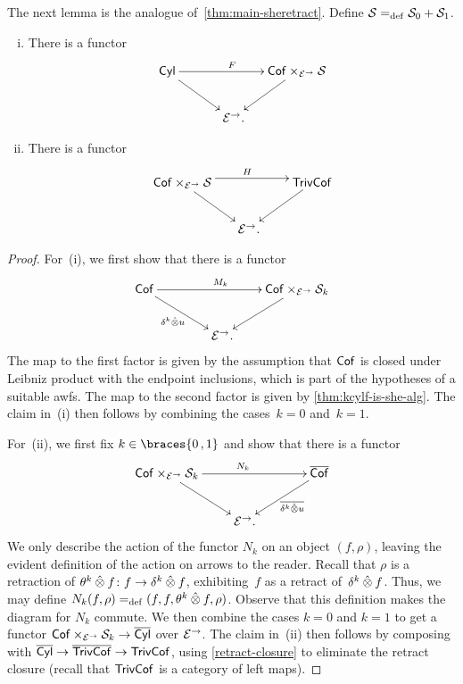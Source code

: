 \documentclass[reqno,10pt,a4paper,oneside,draft]{amsart}
\begin{document}
{{The next lemma is the analogue of~\cref{thm:main-sheretract}.
Define $\cal{S} \defeq  \cal{S}_0 + \cal{S}_1$.

\begin{proposition} \label{thm:strong-hequiv} \leavevmode
\begin{enumerate}[(i)]
\item \label{thm:onedir} There is a functor
\[
\xymatrix@!C@C-2.5em{
  \Cyl
  \ar[dr]
  \ar[rr]^F
&&
  \Cof \times_{\cal{E}^\to} \cal{S}
  \ar[dl]
\\&
  \catE^\to
\rlap{.}}
\]
\item \label{thm:twodir} There is a functor
\[
\xymatrix@!C@C-2.5em{
  \Cof \times_{\cal{E}^\to} \cal{S}
  \ar[dr]
  \ar@<4pt>[rr]^{H}
&&
  \TrivCof
  \ar[dl]
\\&
  \catE^\to
\rlap{.}}
\]
\end{enumerate}
\end{proposition}

\begin{proof}
For~(i), we first show that there is a functor
\[
\xymatrix@!C@C-2em{
  \Cof
  \ar[dr]_{\kcyl \hatotimes u} \ar[rr]^{M_k}
&&
  \Cof \times_{\cal{E}^\to} \cal{S}_k
  \ar[dl]
\\&
   \catE^\to
\rlap{.}}
\]
The map to the first factor is given by the assumption that $\Cof$ is closed under Leibniz product with the endpoint inclusions, which is part of the hypotheses of a suitable awfs.
The map to the second factor is given by \cref{thm:kcylf-is-she-alg}.
The claim in~(i) then follows by combining the cases~$k = 0$ and~$k = 1$.

For~(ii), we first fix $k \in \braces{0\,, 1}$ and show that there is a functor
\begin{equation} \label{lem:from-strong-hequiv}
\begin{gathered}
\xymatrix@!C@C-2em{
  \Cof \times_{\cal{E}^\to} \cal{S}_k
  \ar[dr]
  \ar[rr]^{N_k}
&&
  \overline{\Cof}
  \ar[dl]^-{\overline{\kcyl \hatotimes u}}
\\&
  \catE^\to
\rlap{.}}
\end{gathered}
\end{equation}
We only describe the action of the functor $N_k$ on an object $(f, \rho)$, leaving the evident definition of the action on arrows to the reader.
Recall that $\rho$ is a retraction of $\thetak \hatotimes f \co f \to \kcyl \hatotimes f$, exhibiting~$f$ as a retract of~$\kcyl \hatotimes f$.
Thus, we may define $N_k(f, \rho) \defeq (f, f, \thetak \hatotimes f, \rho)$.
Observe that this definition makes the diagram for $N_k$ commute.
We then combine the cases $k = 0$ and $k = 1$ to get a functor $\Cof \times_{\cal{E}^\to} \cal{S}_k \to \overline{\Cyl}$ over $\cal{E}^\to$.
The claim in~(ii) then follows by composing with $\overline{\Cyl} \to \overline{\TrivCof} \to \TrivCof$, using \cref{retract-closure} to eliminate the retract closure (recall that $\TrivCof$ is a category of left maps).
\end{proof}

}}
\end{document}
